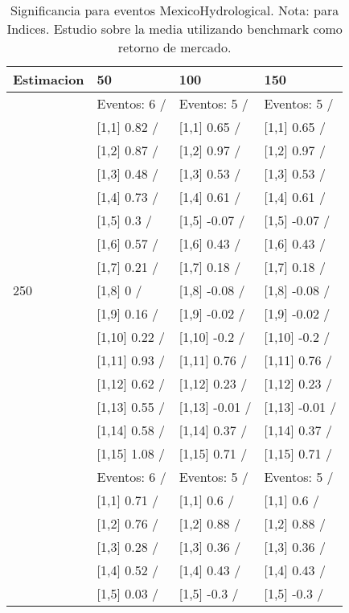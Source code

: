 \begin{table}

\caption{Significancia para eventos MexicoHydrological. Nota: para Indices. Estudio sobre la media utilizando benchmark como retorno de mercado.}
\centering
\begin{tabular}[t]{llll}
\toprule
Estimacion & 50 & 100 & 150\\
\midrule
 & Eventos:  6 / & Eventos:  5 / & Eventos:  5 /\\
 & {}[1,1] 0.82  / & {}[1,1] 0.65  / & {}[1,1] 0.65  /\\
 & {}[1,2] 0.87  / & {}[1,2] 0.97  / & {}[1,2] 0.97  /\\
 & {}[1,3] 0.48  / & {}[1,3] 0.53  / & {}[1,3] 0.53  /\\
 & {}[1,4] 0.73  / & {}[1,4] 0.61  / & {}[1,4] 0.61  /\\
\addlinespace
 & {}[1,5] 0.3  / & {}[1,5] -0.07  / & {}[1,5] -0.07  /\\
 & {}[1,6] 0.57  / & {}[1,6] 0.43  / & {}[1,6] 0.43  /\\
 & {}[1,7] 0.21  / & {}[1,7] 0.18  / & {}[1,7] 0.18  /\\
250 & {}[1,8] 0  / & {}[1,8] -0.08  / & {}[1,8] -0.08  /\\
 & {}[1,9] 0.16  / & {}[1,9] -0.02  / & {}[1,9] -0.02  /\\
\addlinespace
 & {}[1,10] 0.22  / & {}[1,10] -0.2  / & {}[1,10] -0.2  /\\
 & {}[1,11] 0.93  / & {}[1,11] 0.76  / & {}[1,11] 0.76  /\\
 & {}[1,12] 0.62  / & {}[1,12] 0.23  / & {}[1,12] 0.23  /\\
 & {}[1,13] 0.55  / & {}[1,13] -0.01  / & {}[1,13] -0.01  /\\
 & {}[1,14] 0.58  / & {}[1,14] 0.37  / & {}[1,14] 0.37  /\\
\addlinespace
 & {}[1,15] 1.08  / & {}[1,15] 0.71  / & {}[1,15] 0.71  /\\
 & Eventos:  6 / & Eventos:  5 / & Eventos:  5 /\\
 & {}[1,1] 0.71  / & {}[1,1] 0.6  / & {}[1,1] 0.6  /\\
 & {}[1,2] 0.76  / & {}[1,2] 0.88  / & {}[1,2] 0.88  /\\
 & {}[1,3] 0.28  / & {}[1,3] 0.36  / & {}[1,3] 0.36  /\\
\addlinespace
 & {}[1,4] 0.52  / & {}[1,4] 0.43  / & {}[1,4] 0.43  /\\
 & {}[1,5] 0.03  / & {}[1,5] -0.3  / & {}[1,5] -0.3  /\\

\end{tabular}
\end{table}
